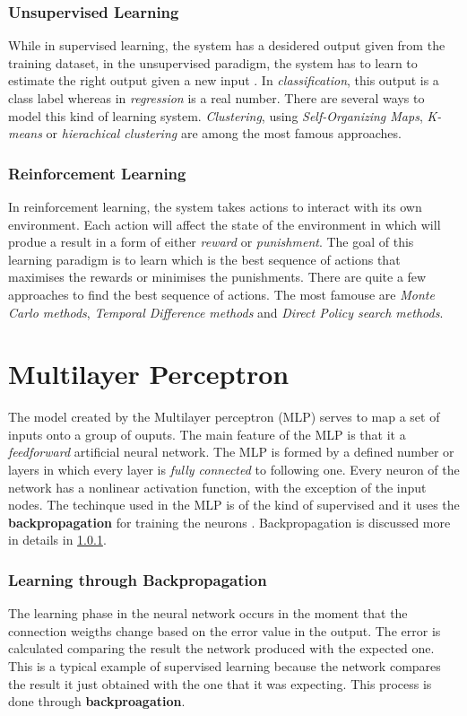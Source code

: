 \subsubsection{Unsupervised Learning}
While in supervised learning, the system has a desidered output given from the training dataset, in the unsupervised paradigm, the system has to learn to estimate the right output given a new input \cite{ghahramani2004unsupervised}. In \textit{classification}, this output is a class label whereas in \textit{regression} is a real number. There are several ways to model this kind of learning system. \textit{Clustering}, using \textit{Self-Organizing Maps}, \textit{K-means} or \textit{hierachical clustering} are among the most famous approaches.

\subsubsection{Reinforcement Learning}
In reinforcement learning, the system takes actions to interact with its own environment. Each action will affect the state of the environment in which will produe a result in a form of either \textit{reward} or \textit{punishment}. The goal of this learning paradigm is to learn which is the best sequence of actions that maximises the rewards or minimises the punishments. There are quite a few approaches to find the best sequence of actions. The most famouse are \textit{Monte Carlo methods}, \textit{Temporal Difference methods} and \textit{Direct Policy search methods}.

\section{Multilayer Perceptron}
The model created by the Multilayer perceptron (MLP) serves to map a set of inputs onto a group of ouputs. The main feature of the MLP is that it a \textit{feedforward} artificial neural network. The MLP is formed by a defined number or layers in which every layer is \textit{fully connected} to following one. Every neuron of the network has a nonlinear activation function, with the exception of the input nodes. The techinque used in the MLP is of the kind of supervised and it uses the \textbf{backpropagation} for training the neurons \cite{mlp_wiki}. Backpropagation is discussed more in details in \ref{ssec:backprop}.

\subsubsection{Learning through Backpropagation} \label{ssec:backprop}
The learning phase in the neural network occurs in the moment that the connection weigths change based on the error value in the output. The error is calculated comparing the result the network produced with the expected one. This is a typical example of supervised learning because the network compares the result it just obtained with the one that it was expecting. This process is done through \textbf{backproagation}. \\

